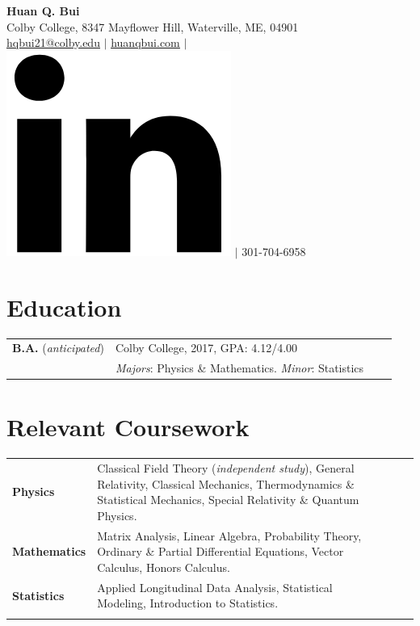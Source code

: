 \documentclass[a4paper, 10.5pt]{article}
\begin{document}
	\begin{center}
		{\LARGE\textbf{Huan Q. Bui}}\\
		\smallskip
		Colby College, 8347 Mayflower Hill, Waterville, ME, 04901\\ \href{mailto:hqbui21@colby.edu}{\underline{hqbui21@colby.edu}} $\vert$ \href{https://huanqbui.com}{\underline{huanqbui.com}} $\vert$ \href{https://www.linkedin.com/in/huan-bui/}{\includegraphics[scale=0.04]{linkedin_logo.PNG}} $\vert$ 301-704-6958
	\end{center}
	\section*{\normalsize{{\color{colby}Education}}}
		\begin{tabular}{lp{12.5cm}lp{8in}}
			\textbf{B.A.} (\textit{anticipated}) & {Colby College}, 2017\textemdash 2021, GPA: 4.12/4.00\\ & \textit{Majors}: Physics \& Mathematics. \textit{Minor}: Statistics\\
		\end{tabular}
	\section*{\normalsize{{\color{colby}Relevant Coursework}}}
	\begin{tabular}{lp{13.5cm}lp{2in}}
		\textbf{Physics} 
		& Classical Field Theory (\textit{independent study}), General Relativity, Classical Mechanics, Thermodynamics \& Statistical Mechanics, Special Relativity \& Quantum Physics.\\
		
		\textbf{Mathematics} 
		&  Matrix Analysis, Linear Algebra, Probability Theory, Ordinary \& Partial Differential Equations, Vector Calculus, Honors Calculus.\\
		
		\textbf{Statistics}
		& Applied Longitudinal Data Analysis, Statistical Modeling, Introduction to Statistics.\\\\ 
	\end{tabular}
\end{document}
